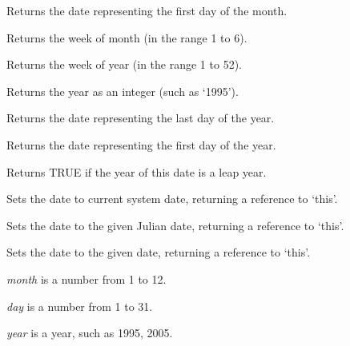 Returns the date representing the first day of the month.



Returns the week of month (in the range 1 to 6).



Returns the week of year (in the range 1 to 52).


 

Returns the year as an integer (such as `1995').



Returns the date representing the last day of the year.



Returns the date representing the first day of the year.


 

Returns TRUE if the year of this date is a leap year.



Sets the date to current system date, returning a reference to `this'.


Sets the date to the given Julian date, returning a reference to `this'.


Sets the date to the given date, returning a reference to `this'.

{\it month} is a number from 1 to 12.

{\it day} is a number from 1 to 31.

{\it year} is a year, such as 1995, 2005.



